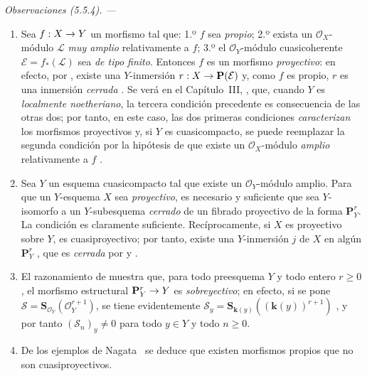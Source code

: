 \documentclass[oneside,10pt]{amsart}
\makeatletter
\renewcommand{\geq}{\geqslant}
\newcommand{\ega@arrow}[2]{\mathchoice{#1}{#2}{#2}{#2}}
\renewcommand{\to}{\ega@arrow{\longrightarrow}{\rightarrow}}
\newcommand{\oldpage}[2][]{\marginnote{\normalfont\footnotesize\textbf{#1}~|~#2}\ignorespaces}
\let\EGAOriginalLabel\label
\renewcommand{\label}[1]{\phantomsection\EGAOriginalLabel{#1}}
\makeatother
\begin{document}
\par\medskip\noindent\textit{Observaciones (5.5.4). ---\ }
\label{II.5.5.4-fr}
\medskip\noindent
\begin{enumerate}
  \item[(i)] Sea $f:X\to Y$ un morfismo tal que: 1.º $f$ sea \emph{propio}; 2.º exista un $\mathcal{O}_X$-módulo $\mathcal{L}$ \emph{muy amplio} relativamente a $f$; 3.º el $\mathcal{O}_Y$-módulo cuasicoherente $\mathcal{E}=f_*(\mathcal{L})$ sea \emph{de tipo finito}.
    Entonces $f$ es un morfismo \emph{proyectivo}: en efecto, por , existe una $Y$-inmersión $r:X\to\mathbf{P}(\mathcal{E})$ y, como $f$ es propio, $r$ es una inmersión \emph{cerrada} .
    Se verá en el Capítulo~III, , que, cuando $Y$ es \emph{localmente noetheriano}, la tercera condición precedente es consecuencia de las otras dos; por tanto, en este caso, las dos primeras condiciones \emph{caracterizan} los morfismos proyectivos y, si $Y$ es cuasicompacto, se puede reemplazar la segunda condición por la hipótesis de que existe un $\mathcal{O}_X$-módulo \emph{amplio} relativamente a $f$ .
  \item[(ii)] Sea $Y$ un esquema cuasicompacto tal que existe un $\mathcal{O}_Y$-módulo amplio.
    Para que un $Y$-esquema $X$ sea \emph{proyectivo}, es necesario y suficiente que sea $Y$-isomorfo a un $Y$-subesquema \emph{cerrado} de un fibrado proyectivo de la forma $\mathbf{P}_Y^r$.
    La condición es claramente suficiente.
\oldpage[II]{105}
    Recíprocamente, si $X$ es proyectivo sobre $Y$, es cuasiproyectivo; por tanto, existe una $Y$-inmersión $j$ de $X$ en algún $\mathbf{P}_Y^r$ , que es \emph{cerrada} por  y .
  \item[(iii)] El razonamiento de  muestra que, para todo preesquema $Y$ y todo entero $r\geq0$, el morfismo estructural $\mathbf{P}_Y^r\to Y$ es \emph{sobreyectivo}; en efecto, si se pone $\mathcal{S}=\mathbf{S}_{\mathcal{O}_Y}(\mathcal{O}_Y^{r+1})$, se tiene evidentemente $\mathcal{S}_y=\mathbf{S}_{\boldsymbol{k}(y)}((\boldsymbol{k}(y))^{r+1})$ , y por tanto $(\mathcal{S}_n)_y\neq0$ para todo $y\in Y$ y todo $n\geq0$.
  \item[(iv)] De los ejemplos de Nagata~\cite{II-26} se deduce que existen morfismos propios que no son cuasiproyectivos.
\end{enumerate}

\end{document}

